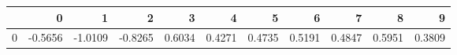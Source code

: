 \begin{tabular}{lrrrrrrrrrr}
\toprule
{} &       0 &       1 &       2 &       3 &       4 &       5 &       6 &       7 &       8 &       9 \\
\midrule
0 & -0.5656 & -1.0109 & -0.8265 &  0.6034 &  0.4271 &  0.4735 &  0.5191 &  0.4847 &  0.5951 &  0.3809 \\
\bottomrule
\end{tabular}
